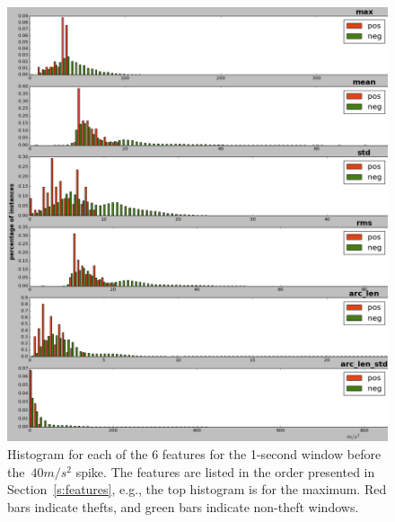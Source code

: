 

\begin{figure}[t]
\centering
\begin{minipage}[t]{0.4\textwidth}
\includegraphics[width=\textwidth]{hist_features_before_win_size_1_2.png}
\caption{Histogram for each of the 6 features for the 1-second window before the~$40 m/s^2$ spike.  The features are listed in the order presented in Section~\ref{s:features}, e.g., the top histogram is for the maximum.  Red bars indicate thefts, and green bars indicate non-theft windows.}
\label{fig:beforehist}
\end{minipage}
\hfill
\begin{minipage}[t]{0.4\textwidth}

\end{minipage}
\end{figure}
